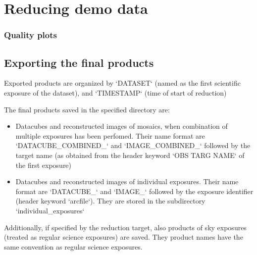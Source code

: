 
\section{Reducing demo data}
\label{sec:reducing_demo_data}



 
\subsubsection{Quality plots}


\subsection{Exporting the final products}
\label{sec:export_final_products}



  
 
Exported products are organized by `DATASET` (named as the first
scientific exposure of the dataset), and `TIMESTAMP` (time of start of
reduction)

The final products saved in the specified directory are:
\begin{itemize}
\item Datacubes and reconstructed images of mosaics, when combination of multiple exposures has been perfomed. Their name
  format are
  `DATACUBE\_COMBINED\_` and `IMAGE\_COMBINED\_` followed by the target name (as obtained from the header
  keyword `OBS TARG NAME` of the first exposure)
\item Datacubes and reconstructed images of individual exposures. Their name format are
  `DATACUBE\_` and `IMAGE\_` followed by the exposure identifier (header keyword `arcfile`).
  They are stored in the subdirectory `individual\_exposures`
\end{itemize}

Additionally, if specified by the reduction target, also products of
sky exposures (treated as regular science exposures) are saved. They
product names have the same convention as regular science exposures.
